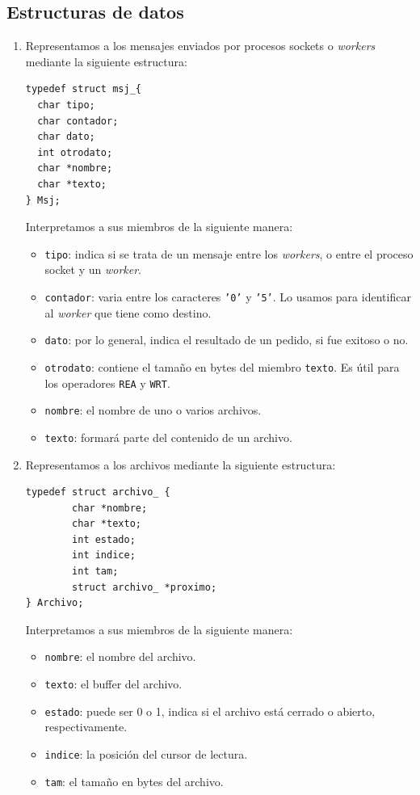 \documentclass[a4paper, 8pt]{article}
\begin{document}
\subsection{Estructuras de datos}
\begin{enumerate}
\item Representamos a los mensajes enviados por procesos sockets o \textit{workers} mediante la siguiente estructura:
\begin{verbatim}
typedef struct msj_{
  char tipo;
  char contador;
  char dato;
  int otrodato;
  char *nombre;
  char *texto;
} Msj;
\end{verbatim}

\newpage
Interpretamos a sus miembros de la siguiente manera:

\begin{itemize}
  \item \texttt{tipo}: indica si se trata de un mensaje entre los \textit{workers}, o entre el proceso socket y un \textit{worker}.
  \item \texttt{contador}: varia entre los caracteres \texttt{'0'} y \texttt{'5'}. Lo usamos para identificar al \textit{worker} que tiene como destino.
  \item \texttt{dato}: por lo general, indica el resultado de un pedido, si fue exitoso o no.
  \item \texttt{otrodato}: contiene el tamaño en bytes del miembro \texttt{texto}. Es útil para los operadores \texttt{REA} y \texttt{WRT}.
  \item \texttt{nombre}: el nombre de uno o varios archivos.
  \item \texttt{texto}: formará parte del contenido de un archivo.
\end{itemize}

\item Representamos a los archivos mediante la siguiente estructura:

\begin{verbatim}
typedef struct archivo_ {
	    char *nombre;
	    char *texto;
	    int estado;
	    int indice;
	    int tam;
	    struct archivo_ *proximo;
} Archivo;
\end{verbatim}

Interpretamos a sus miembros de la siguiente manera:

\begin{itemize}
  \item \texttt{nombre}: el nombre del archivo.
  \item \texttt{texto}: el buffer del archivo.
  \item \texttt{estado}: puede ser 0 o 1, indica si el archivo está cerrado o abierto, respectivamente.
  \item \texttt{indice}: la posición del cursor de lectura.
  \item \texttt{tam}: el tamaño en bytes del archivo.
\end{itemize}

\end{enumerate}
\end{document}

